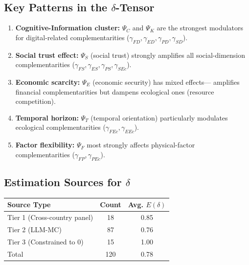 \documentclass[11pt,a4paper]{article}
\theoremstyle{definition}
\begin{document}
\subsection{Key Patterns in the $\delta$-Tensor}

\begin{enumerate}
    \item \textbf{Cognitive-Information cluster:} $\Psi_C$ and $\Psi_K$ are the 
    strongest modulators for digital-related complementarities ($\gamma_{FD}, \gamma_{ED}, 
    \gamma_{PD}, \gamma_{SD}$).
    
    \item \textbf{Social trust effect:} $\Psi_S$ (social trust) strongly amplifies 
    all social-dimension complementarities ($\gamma_{FS}, \gamma_{ES}, \gamma_{PS}, \gamma_{SEc}$).
    
    \item \textbf{Economic scarcity:} $\Psi_E$ (economic security) has mixed effects---
    amplifies financial complementarities but dampens ecological ones (resource competition).
    
    \item \textbf{Temporal horizon:} $\Psi_T$ (temporal orientation) particularly 
    modulates ecological complementarities ($\gamma_{FEc}, \gamma_{EEc}$).
    
    \item \textbf{Factor flexibility:} $\Psi_F$ most strongly affects physical-factor 
    complementarities ($\gamma_{FP}, \gamma_{PEc}$).
\end{enumerate}

\subsection{Estimation Sources for $\delta$}

\begin{center}
\begin{tabular}{lcc}
\toprule
\textbf{Source Type} & \textbf{Count} & \textbf{Avg. $E(\delta)$} \\
\midrule
Tier 1 (Cross-country panel) & 18 & 0.85 \\
Tier 2 (LLM-MC) & 87 & 0.76 \\
Tier 3 (Constrained to 0) & 15 & 1.00 \\
\midrule
Total & 120 & 0.78 \\
\bottomrule
\end{tabular}
\end{center}
\end{document}

